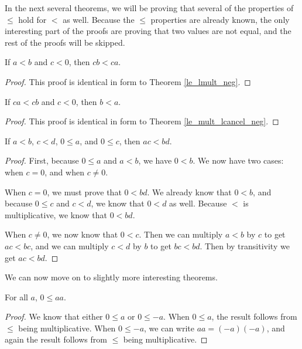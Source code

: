 \documentclass[../../math.tex]{subfiles}
\begin{document}
In the next several theorems, we will be proving that several of the properties
of $\leq$ hold for $<$ as well.  Because the $\leq$ properties are already
known, the only interesting part of the proofs are proving that two values are
not equal, and the rest of the proofs will be skipped.

\begin{theorem}
    If $a < b$ and $c < 0$, then $cb < ca$.
\end{theorem}
\begin{proof}
    This proof is identical in form to Theorem \ref{le_lmult_neg}.
\end{proof}

\begin{theorem}
    If $ca < cb$ and $c < 0$, then $b < a$.
\end{theorem}
\begin{proof}
    This proof is identical in form to Theorem \ref{le_mult_lcancel_neg}.
\end{proof}

\begin{theorem}
    If $a < b$, $c < d$, $0 \leq a$, and $0 \leq c$, then $ac < bd$.
\end{theorem}
\begin{proof}
    First, because $0 \leq a$ and $a < b$, we have $0 < b$.  We now have two
    cases: when $c = 0$, and when $c \neq 0$.

    When $c = 0$, we must prove that $0 < bd$.  We already know that $0 < b$,
    and because $0 \leq c$ and $c < d$, we know that $0 < d$ as well.  Because
    $<$ is multiplicative, we know that $0 < bd$.

    When $c \neq 0$, we now know that $0 < c$.  Then we can multiply $a < b$ by
    $c$ to get $ac < bc$, and we can multiply $c < d$ by $b$ to get $bc < bd$.
    Then by transitivity we get $ac < bd$.
\end{proof}

We can now move on to slightly more interesting theorems.

\begin{theorem} \label{square_pos}
    For all $a$, $0 \leq aa$.
\end{theorem}
\begin{proof}
    We know that either $0 \leq a$ or $0 \leq -a$.  When $0 \leq a$, the result
    follows from $\leq$ being multiplicative.  When $0 \leq -a$, we can write
    $aa = (-a)(-a)$, and again the result follows from $\leq$ being
    multiplicative.
\end{proof}
\end{document}
